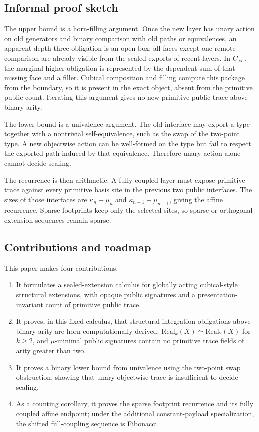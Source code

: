 \documentclass{lmcs}
\newcommand{\Real}{\mathrm{Real}}
\newcommand{\Cext}{C_{\mathrm{ext}}}
\begin{document}
\subsection{Informal proof sketch}
\label{subsec:informal-proof}

The upper bound is a horn-filling argument. Once the new layer has unary action on old generators and binary comparison with old paths or equivalences, an apparent depth-three obligation is an open box: all faces except one remote comparison are already visible from the sealed exports of recent layers. In $\Cext$, the marginal higher obligation is represented by the dependent sum of that missing face and a filler. Cubical composition and filling compute this package from the boundary, so it is present in the exact object, absent from the primitive public count. Iterating this argument gives no new primitive public trace above binary arity.

The lower bound is a univalence argument. The old interface may export a type together with a nontrivial self-equivalence, such as the swap of the two-point type. A new objectwise action can be well-formed on the type but fail to respect the exported path induced by that equivalence. Therefore unary action alone cannot decide sealing.

The recurrence is then arithmetic. A fully coupled layer must expose primitive trace against every primitive basis site in the previous two public interfaces. The sizes of those interfaces are $\kappa_n+\mu_n$ and $\kappa_{n-1}+\mu_{n-1}$, giving the affine recurrence. Sparse footprints keep only the selected sites, so sparse or orthogonal extension sequences remain sparse.

\subsection{Contributions and roadmap}

This paper makes four contributions.

\begin{enumerate}
\item It formulates a sealed-extension calculus for globally acting cubical-style structural extensions, with opaque public signatures and a presentation-invariant count of primitive public trace.
\item It proves, in this fixed calculus, that structural integration obligations above binary arity are horn-computationally derived: $\Real_k(X)\simeq\Real_2(X)$ for $k\geq2$, and $\mu$-minimal public signatures contain no primitive trace fields of arity greater than two.
\item It proves a binary lower bound from univalence using the two-point swap obstruction, showing that unary objectwise trace is insufficient to decide sealing.
\item As a counting corollary, it proves the sparse footprint recurrence and its fully coupled affine endpoint; under the additional constant-payload specialization, the shifted full-coupling sequence is Fibonacci.
\end{enumerate}
\end{document}
